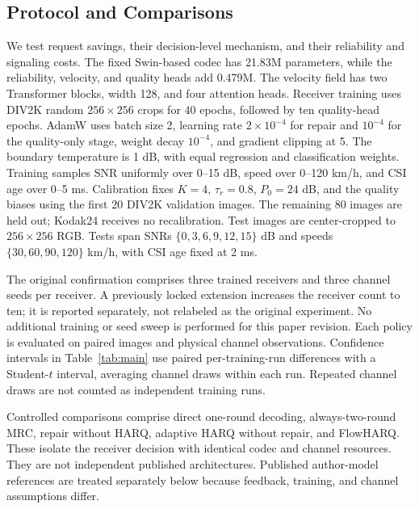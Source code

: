 \documentclass[conference]{IEEEtran}
\begin{document}
\subsection{Protocol and Comparisons}
We test request savings, their decision-level mechanism, and their reliability
and signaling costs.
The fixed Swin-based codec has 21.83M parameters, while the reliability,
velocity, and quality heads add 0.479M. The velocity field has two Transformer
blocks, width 128, and four attention heads. Receiver training uses DIV2K
\cite{div2k} random $256\times256$ crops for 40 epochs, followed by ten
quality-head epochs. AdamW uses batch size 2, learning rate $2\times10^{-4}$
for repair and $10^{-4}$ for the quality-only stage, weight decay $10^{-4}$,
and gradient clipping at 5. The boundary temperature is 1 dB, with equal
regression and classification weights. Training samples SNR
uniformly over 0--15 dB, speed over 0--120 km/h, and CSI age over 0--5 ms.
Calibration fixes $K=4$, $\tau_r=0.8$, $P_0=24$ dB, and the quality biases
using the first 20 DIV2K validation images. The remaining 80 images are held
out; Kodak24 receives no recalibration. Test images are center-cropped to
$256\times256$ RGB. Tests span SNRs $\{0,3,6,9,12,15\}$ dB and speeds
$\{30,60,90,120\}$ km/h, with CSI age fixed at 2 ms.

The original confirmation comprises three trained receivers and three channel
seeds per receiver. A previously locked extension increases the receiver count
to ten; it is reported separately, not relabeled as the original experiment.
No additional training or seed sweep is performed for this paper revision.
Each policy is evaluated on paired images and physical channel observations.
Confidence intervals in Table~\ref{tab:main} use paired per-training-run
differences with a Student-$t$ interval, averaging channel draws within each
run. Repeated channel draws are not counted as independent training runs.

Controlled comparisons comprise direct one-round decoding, always-two-round
MRC, repair without HARQ, adaptive HARQ without repair, and FlowHARQ. These
isolate the receiver decision with identical codec and channel resources.
They are not independent published architectures. Published author-model
references are treated separately below because feedback, training, and
channel assumptions differ.

\begin{table}[t]
\caption{Paired FlowHARQ minus adaptive HARQ. Positive saving means fewer NACKs;
positive $\Delta$LPIPS means worse perceptual distance. Original and extended
cohorts are separated. PSNR is in dB.}
\label{tab:main}
\centering
\resizebox{\columnwidth}{!}{}
\end{table}
\end{document}
